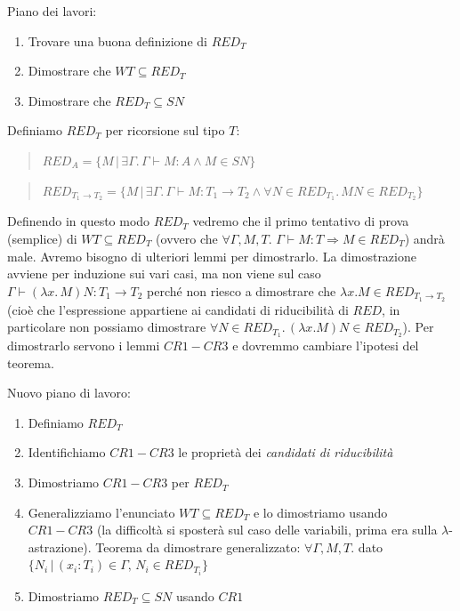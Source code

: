 \documentclass{article}
\begin{document}
\bigskip

\noindent Piano dei lavori:
\begin{enumerate}
    \item Trovare una buona definizione di $RED_T$
    \item Dimostrare che $WT\subseteq RED_T$
    \item Dimostrare che $RED_T\subseteq SN$
\end{enumerate}

\bigskip

Definiamo $RED_T$ per ricorsione sul tipo $T$:
\begin{quote}
    $RED_A = \{M\,|\,\exists\Gamma.\,\Gamma\vdash M:A\land M\in SN\}$
\end{quote}
\begin{quote}
    $RED_{T_1\to T_2} = \{M\,|\,\exists\Gamma.\,\Gamma\vdash M:T_1\to T_2\land \forall N\in RED_{T_1}.\, MN\in RED_{T_2}\}$
\end{quote}

Definendo in questo modo $RED_T$ vedremo che il primo tentativo di prova (semplice) di  $WT\subseteq RED_T$ (ovvero che $\forall \Gamma,M,T.\,\,\Gamma\vdash M:T \Rightarrow M\in RED_T$) andrà male. Avremo bisogno di ulteriori lemmi per dimostrarlo. La dimostrazione avviene per induzione sui vari casi, ma non viene sul caso $\Gamma\vdash(\lambda x.\,M)N:T_1\to T_2$ perché non riesco a dimostrare che $\lambda x.M \in RED_{T_1\to T_2}$ (cioè che l'espressione appartiene ai candidati di riducibilità di $RED$, in particolare non possiamo dimostrare $\forall N\in RED_{T_1}.\,(\lambda x.M)N\in RED_{T_2}$). Per dimostrarlo servono i lemmi $CR1-CR3$ e dovremmo cambiare l'ipotesi del teorema.

\bigskip

\noindent Nuovo piano di lavoro:
\begin{enumerate}
    \item Definiamo $RED_T$
    \item Identifichiamo $CR1-CR3$ le proprietà dei \textit{candidati di riducibilità}
    \item Dimostriamo $CR1-CR3$ per $RED_T$
    \item Generalizziamo l'enunciato $WT\subseteq RED_T$ e lo dimostriamo usando $CR1-CR3$ (la difficoltà si sposterà sul caso delle variabili, prima era sulla $\lambda$-astrazione). Teorema da dimostrare generalizzato: $\forall\Gamma,M,T.$ dato $\{N_i\,|\,(x_i:T_i)\in\Gamma,\,N_i\in RED_{T_i}\}$
    \item Dimostriamo $RED_T\subseteq SN$ usando $CR1$
\end{enumerate}
\end{document}
